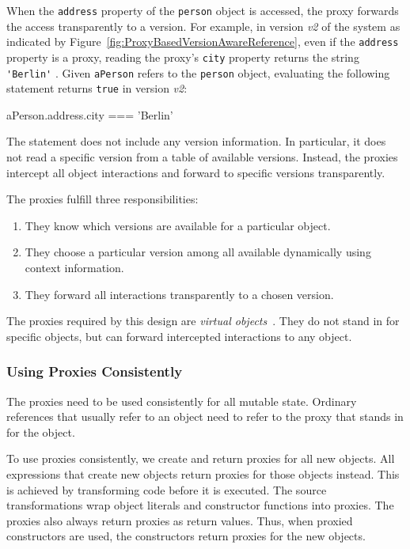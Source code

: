 When the \lstinline{address} property of the \lstinline{person} object is accessed, the proxy forwards the access transparently to a version.
For example, in version \emph{v2} of the system as indicated by Figure~\ref{fig:ProxyBasedVersionAwareReference}, even if the \lstinline{address} property is a proxy, reading the proxy's \lstinline{city} property returns the string \lstinline{'Berlin'} .
Given \lstinline{aPerson} refers to the \lstinline{person} object, evaluating the following statement returns \lstinline{true} in version \emph{v2}:

\begin{code}{}{}
aPerson.address.city === 'Berlin'
\end{code}
\iffalse
\end{verbatim}\fi

The statement does not include any version information.
In particular, it does not read a specific version from a table of available versions.
Instead, the proxies intercept all object interactions and forward to specific versions transparently.

The proxies fulfill three responsibilities:
\begin{enumerate}
    \item They know which versions are available for a particular object.
    \item They choose a particular version among all available dynamically using context information.
    \item They forward all interactions transparently to a chosen version.
\end{enumerate}

The proxies required by this design are \emph{virtual objects}~\cite{VanCutsem2010PDP}.
They do not stand in for specific objects, but can forward intercepted interactions to any object.


\subsubsection{Using Proxies Consistently}

The proxies need to be used consistently for all mutable state.
Ordinary references that usually refer to an object need to refer to the proxy that stands in for the object.

To use proxies consistently, we create and return proxies for all new objects.
All expressions that create new objects return proxies for those objects instead.
This is achieved by transforming code before it is executed.
The source transformations wrap object literals and constructor functions into proxies.
The proxies also always return proxies as return values.
Thus, when proxied constructors are used, the constructors return proxies for the new objects.

